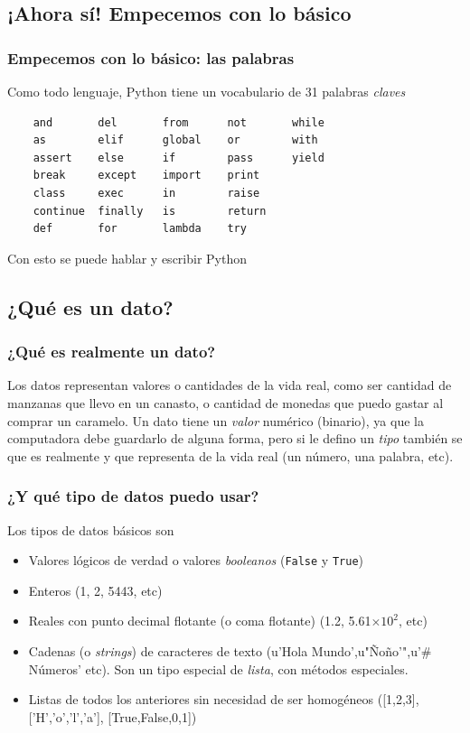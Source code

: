 \documentclass{beamer}
\begin{document}
\subsection{¡Ahora sí! Empecemos con lo básico}
\begin{frame}[fragile]
  \frametitle{Empecemos con lo básico: las palabras}
  Como todo lenguaje, Python tiene un vocabulario de 31 palabras \emph{claves}
  \begin{verbatim}
    and       del       from      not       while
    as        elif      global    or        with
    assert    else      if        pass      yield
    break     except    import    print
    class     exec      in        raise
    continue  finally   is        return 
    def       for       lambda    try
  \end{verbatim}
  Con esto se puede hablar y escribir Python
\end{frame}

\subsection{¿Qué es un dato?}
\begin{frame}
    \frametitle{¿Qué es realmente un dato?}
    Los datos representan valores o cantidades de la vida real, como ser cantidad de manzanas que llevo en un canasto, o cantidad de monedas que puedo gastar al comprar un caramelo.
    \vskip11pt
    Un dato tiene un \emph{valor} numérico (binario), ya que la computadora debe guardarlo de alguna forma, pero si le defino un \emph{tipo} también se que es realmente y que representa de la vida real (un número, una palabra, etc).

\end{frame}

\begin{frame}
    \frametitle{¿Y qué tipo de datos puedo usar?}
    Los tipos de datos básicos son
    \begin{itemize}[<+->]
    \item Valores lógicos de verdad o valores \emph{booleanos} (\texttt{False} y \texttt{True})
    \item Enteros (1, 2, 5443, etc)
    \item Reales con punto decimal flotante (o coma flotante) (1.2, 5.61$\times 10^2$, etc)
    \item Cadenas (o \emph{strings}) de caracteres de texto (u'Hola Mundo',u"Ñoño'",u'\# Números' etc). Son un tipo especial de \emph{lista}, con métodos especiales.
    \item Listas de todos los anteriores sin necesidad de ser homogéneos ([1,2,3], ['H','o','l','a'], [True,False,0,1])
    \end{itemize}
\end{frame}
\end{document}
